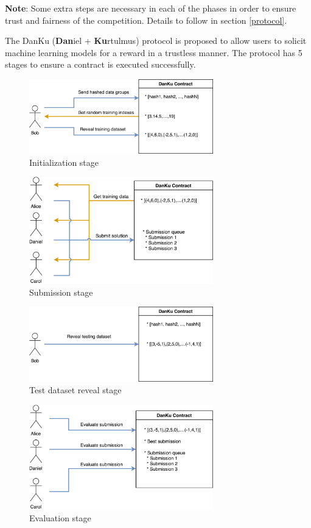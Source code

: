 \documentclass{article}
\begin{document}
\textbf{Note}: Some extra steps are necessary in each of the phases in order to ensure trust and fairness of the competition. Details to follow in section \ref{protocol}.

The DanKu (\textbf{Dan}iel + \textbf{Ku}rtulmus) protocol is proposed to allow users to solicit machine learning models for a reward in a trustless manner. The protocol has 5 stages to ensure a contract is executed successfully.

\begin{figure}[h]
\caption{Initialization stage}
\includegraphics[width=8cm]{protocol_init}
\end{figure}
\begin{figure}[h]
\caption{Submission stage}
\includegraphics[width=8cm]{protocol_submission}
\end{figure}
\begin{figure}[h]
\caption{Test dataset reveal stage}
\includegraphics[width=8cm]{protocol_test_reveal}
\end{figure}
\begin{figure}[h]
\caption{Evaluation stage}
\includegraphics[width=8cm]{protocol_evaluation}
\end{figure}
\end{document}
